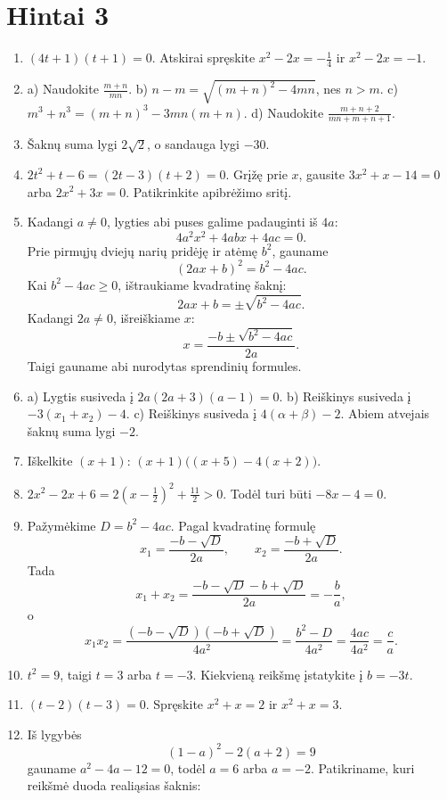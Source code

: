 \documentclass[11pt,a4paper]{scrartcl}
\begin{document}
\section{Hintai 3}
\begin{enumerate}
    \item $(4t+1)(t+1)=0$. Atskirai spręskite
    $x^2-2x=-\frac14$ ir $x^2-2x=-1$.
    \item a) Naudokite $\frac{m+n}{mn}$.
    b) $n-m=\sqrt{(m+n)^2-4mn}$, nes $n>m$.
    c) $m^3+n^3=(m+n)^3-3mn(m+n)$.
    d) Naudokite $\frac{m+n+2}{mn+m+n+1}$.
    \item Šaknų suma lygi $2\sqrt2$, o sandauga lygi $-30$.
    \item $2t^2+t-6=(2t-3)(t+2)=0$.
    Grįžę prie $x$, gausite $3x^2+x-14=0$ arba $2x^2+3x=0$.
    Patikrinkite apibrėžimo sritį.
    \item Kadangi $a\ne0$, lygties abi puses galime padauginti iš
    $4a$:
    \[
    4a^2x^2+4abx+4ac=0.
    \]
    Prie pirmųjų dviejų narių pridėję ir atėmę $b^2$, gauname
    \[
    (2ax+b)^2=b^2-4ac.
    \]
    Kai $b^2-4ac\ge0$, ištraukiame kvadratinę šaknį:
    \[
    2ax+b=\pm\sqrt{b^2-4ac}.
    \]
    Kadangi $2a\ne0$, išreiškiame $x$:
    \[
    x=\frac{-b\pm\sqrt{b^2-4ac}}{2a}.
    \]
    Taigi gauname abi nurodytas sprendinių formules.
    \item a) Lygtis susiveda į $2a(2a+3)(a-1)=0$.
    b) Reiškinys susiveda į $-3(x_1+x_2)-4$.
    c) Reiškinys susiveda į $4(\alpha+\beta)-2$.
    Abiem atvejais šaknų suma lygi $-2$.
    \item Iškelkite $(x+1)$:
    $(x+1)\bigl((x+5)-4(x+2)\bigr)$.
    \item $2x^2-2x+6=2\left(x-\frac12\right)^2+\frac{11}{2}>0$.
    Todėl turi būti $-8x-4=0$.
    \item Pažymėkime $D=b^2-4ac$. Pagal kvadratinę formulę
    \[
    x_1=\frac{-b-\sqrt D}{2a},\qquad
    x_2=\frac{-b+\sqrt D}{2a}.
    \]
    Tada
    \[
    x_1+x_2
    =\frac{-b-\sqrt D-b+\sqrt D}{2a}
    =-\frac ba,
    \]
    o
    \[
    x_1x_2
    =\frac{(-b-\sqrt D)(-b+\sqrt D)}{4a^2}
    =\frac{b^2-D}{4a^2}
    =\frac{4ac}{4a^2}
    =\frac ca.
    \]
    \item $t^2=9$, taigi $t=3$ arba $t=-3$.
    Kiekvieną reikšmę įstatykite į $b=-3t$.
    \item $(t-2)(t-3)=0$. Spręskite $x^2+x=2$ ir $x^2+x=3$.
    \item Iš lygybės
    \[
    (1-a)^2-2(a+2)=9
    \]
    gauname $a^2-4a-12=0$, todėl $a=6$ arba $a=-2$.
    Patikriname, kuri reikšmė duoda realiąsias šaknis:

\end{enumerate}
\end{document}
